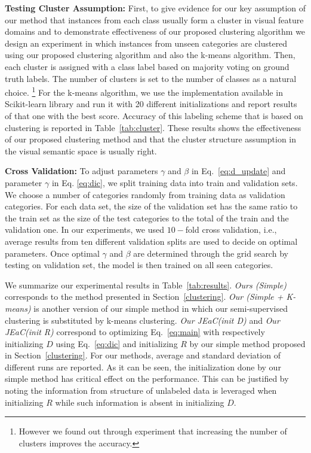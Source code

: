 \documentclass[10pt,twocolumn,letterpaper]{article}
\begin{document}
\textbf{Testing Cluster Assumption:}
First, to give evidence for our key assumption of our method that instances from each class usually form a cluster in visual feature domains
and to demonstrate effectiveness of our proposed clustering algorithm we design an
experiment in which instances from unseen categories are clustered using our proposed clustering algorithm and also the k-means algorithm. Then,
each cluster is assigned with a class label based on majority voting on ground truth labels. The number of clusters
 is set to the number of classes as a natural choice.
 \footnote{However we found out through experiment that increasing the number of clusters improves the accuracy.}
For the k-means algorithm, we use the implementation available in Scikit-learn library \cite{scikit-learn} and run it with 20 different initializations
and report results of that one with the best score.
Accuracy of this labeling scheme that is based on clustering is reported in Table~\ref{tab:cluster}.
These results shows the effectiveness of our proposed clustering method and that the cluster structure assumption in the visual semantic space is usually right.

\textbf{Cross Validation:}
To adjust parameters $\gamma$ and $\beta$ in Eq.~\ref{eq:d_update} and parameter $\gamma$ in Eq. \ref{eq:dic}, we split training data into train and validation sets.
We choose a number of categories randomly from training data as validation categories. For each data set, the size of the
validation set has the same ratio to the train set as the size of the test categories to the total of the train and the validation one.
In our experiments, we used $10-$fold cross validation, i.e., average results from ten different validation splits are used to decide on
optimal parameters.
Once optimal $\gamma$ and $\beta$ are determined through the grid search by testing on validation set, the model
is then trained on all seen categories.

We summarize our experimental results in Table~\ref{tab:results}.
\textit{Ours (Simple)} corresponds to the method presented in Section~\ref{clustering}.
\textit{Our (Simple + K-means)} is another version of our simple  method in which our semi-supervised clustering is substituted by k-means clustering.
\textit{Our JEaC(init D)} and \textit{Our JEaC(init R)} correspond to optimizing Eq.~\eqref{eq:main}
with respectively initializing $D$ using Eq.~\eqref{eq:dic} and initializing $R$ by our simple method proposed in Section~\ref{clustering}.
For our methods, average and standard deviation of different runs are reported. As it can be seen, the initialization done
by our simple method has critical effect on the performance. This can be justified by noting the information from structure of
unlabeled data is leveraged when initializing $R$ while such information is absent in initializing $D$.
\end{document}
